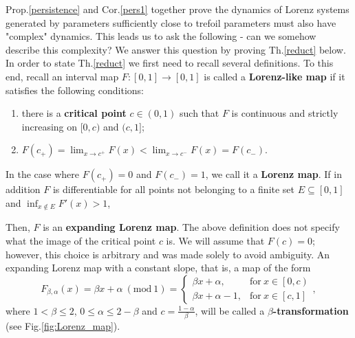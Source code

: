 \documentclass[10pt,reqno]{amsart}
\theoremstyle{plain}
\theoremstyle{assumption}
\theoremstyle{notation}
\theoremstyle{claim}
\theoremstyle{conj}
\theoremstyle{theorem}
\theoremstyle{proposition}
\theoremstyle{corollary}
\newcommand{\Mod}[1]{\ (\mathrm{mod}\ #1)}
\begin{document}
Prop.\ref{persistence} and Cor.\ref{pers1} together prove the dynamics of Lorenz systems generated by parameters sufficiently close to trefoil parameters must also have "complex" dynamics. This leads us to ask the following - can we somehow describe this complexity? We answer this question by proving Th.\ref{reduct} below. In order to state Th.\ref{reduct} we first need to recall several definitions. To this end, recall an interval map $F\colon [0,1]\to [0,1]$ is called a \textbf{Lorenz-like map} if it satisfies the following conditions:
\begin{enumerate}
\item there is a \textbf{critical point} $c\in (0,1)$ such that $F$ is continuous and strictly increasing on $[0,c)$ and $(c,1]$;
\item $F(c_+)=\lim_{x\to c^{+}}F(x)<\lim_{x\to c^{-}}F(x)=F(c_-)$.
\end{enumerate}
In the case where $F(c_+)=0$ and $F(c_-)=1$, we call it a \textbf{Lorenz map}. If in addition  $F$ is differentiable for all points not belonging to a finite set $E\subseteq [0,1]$ and $\inf_{x\not\in E} F'(x)>1$,

Then, $F$ is an \textbf{expanding Lorenz map}. The above definition does not specify what the image of the critical point $c$ is. We will assume that $F(c)=0$; however, this choice is arbitrary and was made solely to avoid ambiguity. An expanding Lorenz map with a constant slope, that is, a map of the form
$$
	F_{\beta,\alpha}(x)=\beta x+\alpha \Mod{1}=
	\begin{cases}
		\beta x+\alpha, &\text{for}\ x\in\left[0,c\right)  \\
		\beta x+\alpha-1, &\text{for}\ x\in \left[c,1\right] 
	\end{cases},
	$$
where $1<\beta\leq2$, $0\leq\alpha\leq2-\beta$ and $c=\frac{1-\alpha}{\beta}$, will be called a \textbf{$\beta$-transformation} (see Fig.\ref{fig:Lorenz_map}).
\end{document}
